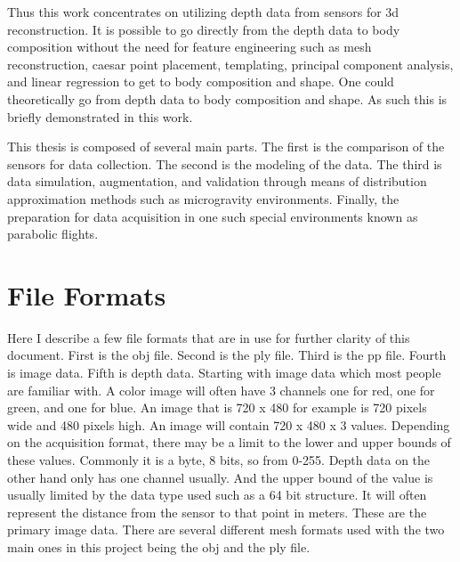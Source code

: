 Thus this work concentrates on utilizing depth data from sensors for 3d reconstruction. It is possible to go directly from the depth data to body composition without the need for feature engineering such as mesh reconstruction, caesar point placement, templating, principal component analysis, and linear regression to get to body composition and shape. One could theoretically go from depth data to body composition and shape. As such this is briefly demonstrated in this work.

This thesis is composed of several main parts. The first is the comparison of the sensors for data collection. The second is the modeling of the data. The third is data simulation, augmentation, and validation through means of distribution approximation methods such as microgravity environments. Finally, the preparation for data acquisition in one such special environments known as parabolic flights.
\section{File Formats}
Here I describe a few file formats that are in use for further clarity of this document. First is the obj file. Second is the ply file. Third is the pp file. Fourth is image data. Fifth is depth data. Starting with image data which most people are familiar with. A color image will often have 3 channels one for red, one for green, and one for blue. An image that is 720 x 480 for example is 720 pixels wide and 480 pixels high. An image will contain 720 x 480 x 3 values. Depending on the acquisition format, there may be a limit to the lower and upper bounds of these values. Commonly it is a byte, 8 bits, so from 0-255. Depth data on the other hand only has one channel usually. And the upper bound of the value is usually limited by the data type used such as a 64 bit structure. It will often represent the distance from the sensor to that point in meters. These are the primary image data. There are several different mesh formats used with the two main ones in this project being the obj and the ply file.


